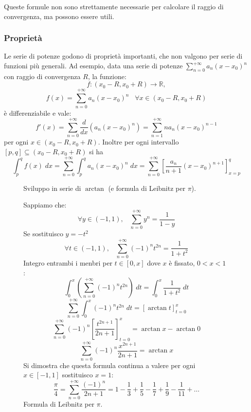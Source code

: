 \documentclass[a4paper]{article}
\theoremstyle{break}
\theoremstyle{break}
\theoremstyle{break}
\theoremstyle{break}
\begin{document}
\vspace{1em}
Queste formule non sono strettamente necessarie per calcolare il raggio di convergenza, ma possono essere
utili.

\subsubsection{Proprietà}
Le serie di potenze godono di proprietà importanti, che non valgono per serie di funzioni più generali.
Ad esempio, data una serie di potenze \( \sum_{n=0}^{+\infty} a_n(x-x_0)^n \) con raggio di convergenza \( R \),
la funzione:
\[
f: (x_0 - R, x_0 + R) \to \mathbb{R},
\] 
\[
f(x) = \sum_{n=0}^{+\infty} a_n(x-x_0)^n \;\;\; \forall x \in (x_0 - R, x_0 + R)
\] 
è differenziabile e vale:
\[
f'(x) = \sum_{n=0}^{+\infty} \frac{d}{dx} \left( a_n(x-x_0)^n \right) = \sum_{n=1}^{+\infty} na_n(x-x_0)^{n-1}
\] 
per ogni \( x \in (x_0 - R, x_0 + R) \). Inoltre per ogni intervallo \( [p,q] \subseteq (x_0-R, x_0+R) \) si ha
\[
\int_{p}^{q} f(x)\;dx = \sum_{n=0}^{+\infty} \int_{p}^{q} a_n(x-x_0)^n\;dx = \sum_{n=0}^{+\infty} \left[ \frac{a_n}{n+1} (x-x_0)^{n+1} \right]_{x=p}^{q}
\] 
\begin{figure}[H]
  \begin{example}
    Sviluppo in serie di \( \arctan \) (e formula di Leibnitz per \( \pi  \)).

    Sappiamo che:
    \[
    \forall y \in (-1,1), \;\;\; \sum_{n=0}^{+\infty} y^n = \frac{1}{1-y}
    \] 
    Se sostituisco \( y=-t^2 \)
    \[
    \forall t \in (-1,1), \;\;\; \sum_{n=0}^{+\infty} (-1)^n t^{2n} = \frac{1}{1+t^2}
    \] 
    Integro entrambi i menbri per \( t \in [0,x] \) dove \( x \) è fissato, \( 0<x<1 \) :
    \[
      \int_{0}^{x} \left( \sum_{n=0}^{+\infty} (-1)^n t^{2n} \right) \;dt = \int_{0}^{x} \frac{1}{1+t^2}\;dt
    \] 
    \[
      \sum_{n=0}^{+\infty} \int_{0}^{x} (-1)^n t^{2n}\;dt = \left[ \arctan t \right]_{t=0}^{x}
    \] 
    \[
      \sum_{n=0}^{+\infty} (-1)^n \left[ \frac{t^{2n+1}}{2n+1} \right]_{t=0}^{x} = \arctan x - \arctan 0
    \] 
    \[
    \sum_{n=0}^{+\infty} (-1)^n \frac{x^{2n+1}}{2n+1} = \arctan x
    \] 
    Si dimostra che questa formula continua a valere per ogni \( x \in [-1,1] \) sostituisco \( x=1 \):
    \[
    \frac{\pi }{4} = \sum_{n=0}^{+\infty} \frac{(-1)^n}{2n+1} = 1 - \frac{1}{3} + \frac{1}{5} - \frac{1}{7} + \frac{1}{9} - \frac{1}{11} + \ldots
    \] 
    Formula di Leibnitz per \( \pi  \).
  \end{example}
\end{figure}
\end{document}

